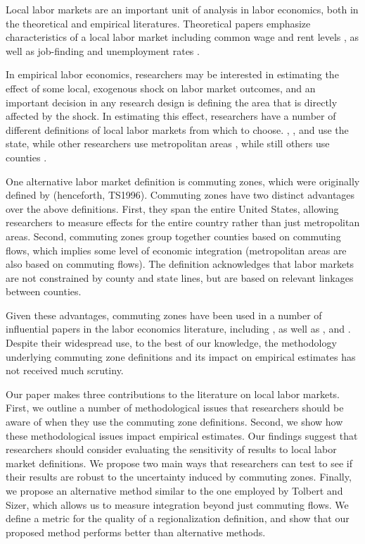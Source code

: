 Local labor markets are an important unit of analysis in labor economics, both in the theoretical and empirical literatures. Theoretical papers emphasize characteristics of a local labor market including common wage and rent levels \citep{Roback1982,Moretti2011}, as well as job-finding and unemployment rates \citep{HL2012,SS2014}.

In empirical labor economics, researchers may be interested in estimating the effect of some local, exogenous shock on labor market outcomes, and an important decision in any research design is defining the area that is directly affected by the shock. In estimating this effect, researchers have a number of different definitions of local labor markets from which to choose. \citet{BK1992}, \citet{Wozniak2010}, and \citet{KW2011} use the state, while other researchers use metropolitan areas \citep{BH2000,Card2001,Notowidigdo2011,Diamond2016}, while still others use counties \citep{MRR2015,FGS2015}.

One alternative labor market definition is commuting zones, which were originally defined by \citet{TS1996} (henceforth, TS1996). Commuting zones have two distinct advantages over the above definitions. First, they span the entire United States, allowing researchers to measure effects for the entire country rather than just metropolitan areas. Second, commuting zones group together counties based on commuting flows, which implies some level of economic integration (metropolitan areas are also based on commuting flows). The definition acknowledges that labor markets are not constrained by county and state lines, but are based on relevant linkages between counties.

Given these advantages, commuting zones have been used in a number of influential papers in the labor economics literature, including \citet{ADH2013}, as well as \citet{Yagan2016}, \citet{Restrepo2015} and \citet{AM2015}. Despite their widespread use, to the best of our knowledge, the methodology underlying commuting zone definitions and its impact on empirical estimates has not received much scrutiny. 

Our paper makes three contributions to the literature on local labor markets. First, we outline a number of methodological issues that researchers should be aware of when they use the commuting zone definitions. Second, we show how these methodological issues impact empirical estimates. Our findings suggest that researchers should consider evaluating the sensitivity of results to local labor market definitions. We propose two main ways that researchers can test to see if their results are robust to the uncertainty induced by commuting zones. Finally, we propose an alternative method similar to the one employed by Tolbert and Sizer, which allows us to measure integration beyond just commuting flows. We define a metric for the quality of a regionalization definition, and show that our proposed method performs better than alternative methods.

